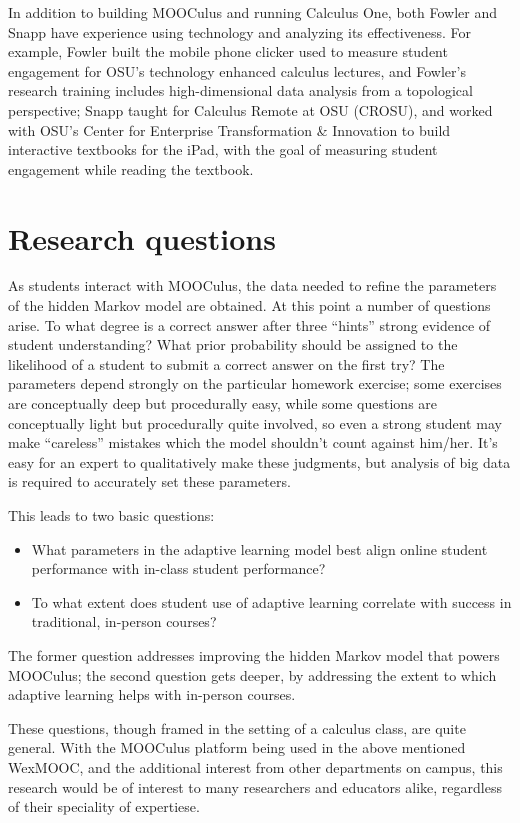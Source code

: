 \documentclass[12pt]{article}
\begin{document}
In addition to building MOOCulus and running Calculus One, both Fowler
and Snapp have experience using technology and analyzing its
effectiveness.  For example, Fowler built the mobile phone clicker
used to measure student engagement for OSU's technology enhanced
calculus lectures, and Fowler's research training includes
high-dimensional data analysis from a topological perspective; Snapp
taught for Calculus Remote at OSU (CROSU), and worked with OSU's
Center for Enterprise Transformation \& Innovation to build
interactive textbooks for the iPad, with the goal of measuring student
engagement while reading the textbook.

\section{Research questions}

As students interact with MOOCulus, the data needed to refine the
parameters of the hidden Markov model are obtained.  At this point a
number of questions arise. To what degree is a correct answer after
three ``hints'' strong evidence of student understanding?  What prior
probability should be assigned to the likelihood of a student to
submit a correct answer on the first try?  The parameters depend
strongly on the particular homework exercise; some exercises are
conceptually deep but procedurally easy, while some questions are
conceptually light but procedurally quite involved, so even a strong
student may make ``careless'' mistakes which the model shouldn't count
against him/her.  It's easy for an expert to qualitatively make these
judgments, but analysis of big data is required to accurately set
these parameters.

This leads to two basic questions:
\begin{itemize}
\item What parameters in the adaptive learning model best align online
  student performance with in-class student performance?
\item To what extent does student use of adaptive learning correlate
  with success in traditional, in-person courses?
\end{itemize}
The former question addresses improving the hidden Markov model that
powers MOOCulus; the second question gets deeper, by addressing the
extent to which adaptive learning helps with in-person courses.

These questions, though framed in the setting of a calculus class, are
quite general. With the MOOCulus platform being used in the above
mentioned WexMOOC, and the additional interest from other departments
on campus, this research would be of interest to many researchers and
educators alike, regardless of their speciality of expertiese.
\end{document}
